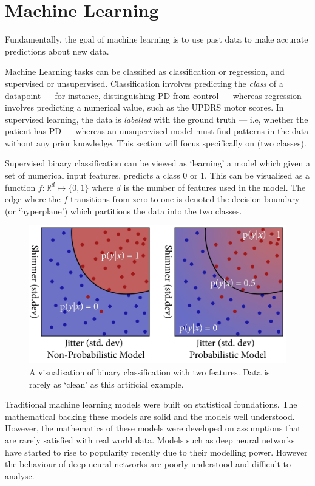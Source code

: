 \documentclass[12pt, twoside]{book}
\renewcommand\emph[1]{\textit{\color{USred}{#1}}}
\begin{document}
\egroup
\section{Machine Learning}
\label{machinelearning}
\begin{highlight}
Fundamentally, the goal of machine learning is to use past data to make accurate predictions about new data. 
\end{highlight}

Machine Learning tasks can be classified as classification or regression, and supervised or unsupervised. Classification involves predicting the \textit{class} of a datapoint --- for instance, distinguishing PD from control --- whereas regression involves predicting a numerical value, such as the UPDRS motor scores. In supervised learning, the data is \textit{labelled} with the ground truth --- i.e, whether the patient has PD --- whereas an unsupervised model must find patterns in the data without any prior knowledge. This section will focus specifically on \emph{supervised binary classification} (two classes). 


Supervised binary classification can be viewed as `learning' a model which given a set of numerical input features, predicts a class 0 or 1. This can be visualised as a function $f : \mathbb{R}^d \mapsto \{0,1\}$ where $d$ is the number of features used in the model. The edge where the $f$ transitions from zero to one is denoted the decision boundary (or `hyperplane') which partitions the data into the two classes. 


\begin{figure}[h]
\centering\includegraphics[width=0.7\linewidth]{binaryclassification2.png}
\caption{A visualisation of binary classification with two features. Data is rarely as `clean' as this artificial example.}
\label{binaryclass}
\end{figure}

Traditional machine learning models were built on statistical foundations. The mathematical backing these models are solid and the models well understood. However, the mathematics of these models were developed on assumptions that are rarely satisfied with real world data. Models such as deep neural networks have started to rise to popularity recently due to their modelling power. However the behaviour of deep neural networks are poorly understood and difficult to analyse.    
\end{document}
